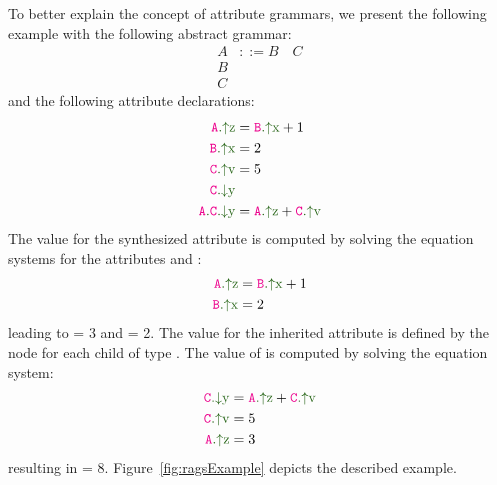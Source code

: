 To better explain the concept of attribute grammars, we present the following
example with the following abstract grammar:
    \begin{align*}
        A& ::= B \quad C \\
        B& \\
        C&
    \end{align*}
and the following attribute declarations:
    \begin{align*}
        \Asyn{A}{z}& = \Asyn{B}{x} + 1 \\
        \Asyn{B}{x}& = 2 \\
        \Asyn{C}{v}& = 5 \\
        \Ainh{C}{y}& \\
        \Ainhdef{A}{C}{y}& = \Asyn{A}{z} + \Asyn{C}{v} \\
    \end{align*}
The value for the synthesized attribute  is computed by solving
the equation systems for the attributes  and :
\begin{align*}
    \Asyn{A}{z} &= \Asyn{B}{x} + 1 \\
    \Asyn{B}{x} &= 2
\end{align*}
leading to  = 3 and  = 2.
The value for the inherited attribute  is defined by the node  for
each child of type . The value of  is computed by solving the equation system:
\begin{align*}
    \Ainh{C}{y} &= \Asyn{A}{z} + \Asyn{C}{v} \\
    \Asyn{C}{v} &= 5\\
    \Asyn{A}{z} &= 3
\end{align*}
resulting in  = 8. Figure~\ref{fig:ragsExample} depicts the described example.


